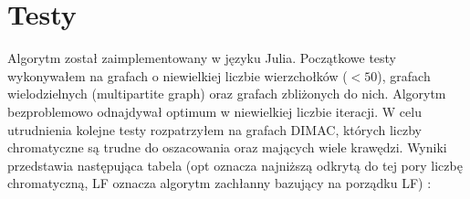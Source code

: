 \documentclass[11pt]{article}
\begin{document}
\newpage
%

\section{Testy}
Algorytm został zaimplementowany w języku Julia. Początkowe testy wykonywałem na grafach o niewielkiej liczbie  wierzchołków ($<50$), grafach wielodzielnych (multipartite graph) oraz grafach zbliżonych do nich. Algorytm bezproblemowo odnajdywał optimum w niewielkiej liczbie iteracji. W celu utrudnienia kolejne testy rozpatrzyłem na grafach DIMAC\cite{DIMAC}, których liczby chromatyczne są trudne do oszacowania oraz mających wiele krawędzi. Wyniki przedstawia następująca tabela (opt oznacza najniższą odkrytą do tej pory liczbę chromatyczną, LF oznacza algorytm zachłanny bazujący na porządku LF) :
\end{document}
